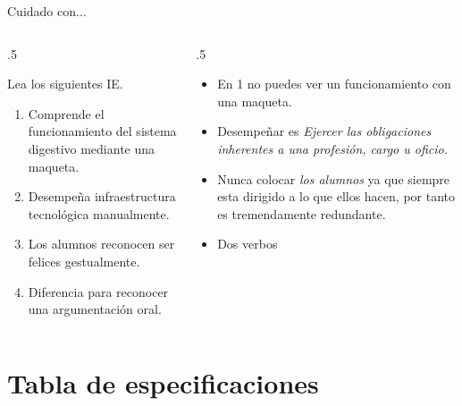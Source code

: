 \documentclass[11pt, aspectratio=169, xcolor=table,hyphens]{beamer}
\begin{document}
\begin{frame}{Cuidado con...}
	\begin{columns}
		\begin{column}{.5\linewidth}
			\begin{exampleblock}{Lea los siguientes IE.}
				\begin{enumerate}
					\item Comprende el funcionamiento del sistema digestivo mediante una maqueta.
					\item Desempeña infraestructura tecnológica manualmente.
					\item Los alumnos reconocen ser felices gestualmente.
					\item Diferencia para reconocer una argumentación oral.
				\end{enumerate}
			\end{exampleblock}
		\end{column}
		\begin{column}{.5\linewidth}
			\begin{itemize}
				\item<2-> En 1 no puedes ver un funcionamiento con una maqueta.
				\item<3-> Desempeñar es \textit{Ejercer las obligaciones inherentes a una profesión, cargo u oficio.}\cite{RAE2021}
				\item<4-> Nunca colocar \textit{los alumnos} ya que siempre esta dirigido a lo que ellos hacen, por tanto es tremendamente redundante.
				\item<5-> Dos verbos
			\end{itemize}

		\end{column}
	\end{columns}
\end{frame}

\section{Tabla de especificaciones}
\end{document}
